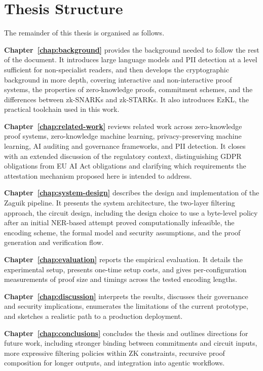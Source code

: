 \section{Thesis Structure}
\label{sec:thesis-structure}

The remainder of this thesis is organised as follows.

\medskip

\textbf{Chapter~\ref{chap:background}} provides the background needed to follow the rest of the document. It introduces large language models and PII detection at a level sufficient for non-specialist readers, and then develops the cryptographic background in more depth, covering interactive and non-interactive proof systems, the properties of zero-knowledge proofs, commitment schemes, and the differences between zk-SNARKs and zk-STARKs. It also introduces EzKL, the practical toolchain used in this work.

\medskip

\textbf{Chapter~\ref{chap:related-work}} reviews related work across zero-knowledge proof systems, zero-knowledge machine learning, privacy-preserving machine learning, AI auditing and governance frameworks, and PII detection. It closes with an extended discussion of the regulatory context, distinguishing GDPR obligations from EU AI Act obligations and clarifying which requirements the attestation mechanism proposed here is intended to address.

\medskip

\textbf{Chapter~\ref{chap:system-design}} describes the design and implementation of the Zaguik pipeline. It presents the system architecture, the two-layer filtering approach, the circuit design, including the design choice to use a byte-level policy after an initial NER-based attempt proved computationally infeasible, the encoding scheme, the formal model and security assumptions, and the proof generation and verification flow.

\medskip

\textbf{Chapter~\ref{chap:evaluation}} reports the empirical evaluation. It details the experimental setup, presents one-time setup costs, and gives per-configuration measurements of proof size and timings across the tested encoding lengths.

\medskip

\textbf{Chapter~\ref{chap:discussion}} interprets the results, discusses their governance and security implications, enumerates the limitations of the current prototype, and sketches a realistic path to a production deployment.

\medskip

\textbf{Chapter~\ref{chap:conclusions}} concludes the thesis and outlines directions for future work, including stronger binding between commitments and circuit inputs, more expressive filtering policies within ZK constraints, recursive proof composition for longer outputs, and integration into agentic workflows.
